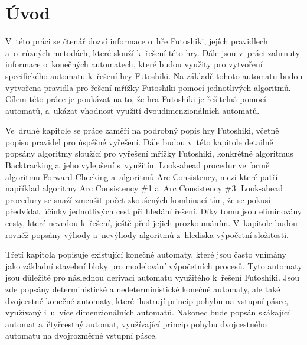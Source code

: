 
%

\chapter{Úvod}

V~této práci se čtenář dozví informace o~hře Futoshiki, jejích pravidlech
a~o~různých metodách, které slouží k~řešení této hry. Dále jsou v~práci
zahrnuty informace o~konečných automatech, které budou využity pro vytvoření
specifického automatu k~řešení hry Futoshiki. Na základě tohoto automatu budou
vytvořena pravidla pro řešení mřížky Futoshiki pomocí jednotlivých algoritmů.
Cílem této práce je poukázat na to, že hra Futoshiki je řešitelná pomocí
automatů, a~ukázat vhodnost využití dvoudimenzionálních automatů.

Ve~druhé kapitole se práce zaměří na podrobný popis hry Futoshiki, včetně
popisu pravidel pro úspěšné vyřešení. Dále budou v~této kapitole detailně
popsány algoritmy sloužící pro vyřešení mřížky Futoshiki, konkrétně algoritmus
Backtracking a~jeho vylepšení s~využitím Look-ahead procedur ve formě algoritmu
Forward Checking a~algoritmů Arc Consistency, mezi které patří například
algoritmy Arc Consistency \#1 a~Arc Consistency \#3. Look-ahead procedury se
snaží zmenšit počet zkoušených kombinací tím, že se pokusí předvídat účinky
jednotlivých cest při hledání řešení. Díky tomu jsou eliminovány cesty, které
nevedou k~řešení, ještě před jejich prozkoumáním. V~kapitole budou rovněž
popsány výhody a~nevýhody algoritmů z~hlediska výpočetní složitosti.

Třetí kapitola popisuje existující konečné automaty, které jsou často vnímány
jako základní stavební bloky pro modelování výpočetních procesů. Tyto automaty
jsou důležité pro následnou derivaci automatu využitého k~řešení Futoshiki.
Jsou zde popsány deterministické a nedeterministické konečné automaty, ale také
dvojcestné konečné automaty, které ilustrují princip pohybu na vstupní pásce,
využívaný i~u~více dimenzionálních automatů. Nakonec bude popsán skákající
automat a~čtyřcestný automat, využívající princip pohybu dvojcestného automatu
na dvojrozměrné vstupní pásce.


